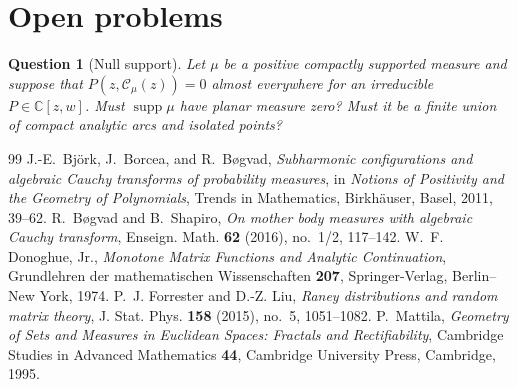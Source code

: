 \documentclass[10pt,a4paper]{amsart}
\newtheorem{question}[theorem]{Question}
\newcommand{\bC}{\mathbb C}
\newcommand{\Cauchy}{\mathcal C}
\newcommand{\supp}{\operatorname{supp}}
\begin{document}
\section{Open problems}\label{sec:open}

\begin{question}[Null support]\label{q:null-support}
Let $\mu$ be a positive compactly supported measure and suppose that
$P(z,\Cauchy_\mu(z))=0$ almost everywhere for an irreducible
$P\in\bC[z,w]$.  Must $\supp\mu$ have planar measure zero?  Must it be a finite
union of compact analytic arcs and isolated points?
\end{question}


\begin{thebibliography}{99}
 J.-E.~Bj\"ork, J.~Borcea, and R.~B\o gvad, \emph{Subharmonic configurations and algebraic Cauchy transforms of probability measures}, in \emph{Notions of Positivity and the Geometry of Polynomials}, Trends in Mathematics, Birkh\"auser, Basel, 2011, 39--62.
 R.~B\o gvad and B.~Shapiro, \emph{On mother body measures with algebraic Cauchy transform}, Enseign. Math. \textbf{62} (2016), no.~1/2, 117--142.
 W.~F. Donoghue, Jr., \emph{Monotone Matrix Functions and Analytic Continuation}, Grundlehren der mathematischen Wissenschaften \textbf{207}, Springer-Verlag, Berlin--New York, 1974.
 P.~J. Forrester and D.-Z. Liu, \emph{Raney distributions and random matrix theory}, J. Stat. Phys. \textbf{158} (2015), no.~5, 1051--1082.
 P.~Mattila, \emph{Geometry of Sets and Measures in Euclidean Spaces: Fractals and Rectifiability}, Cambridge Studies in Advanced Mathematics \textbf{44}, Cambridge University Press, Cambridge, 1995.
\end{thebibliography}
\end{document}
